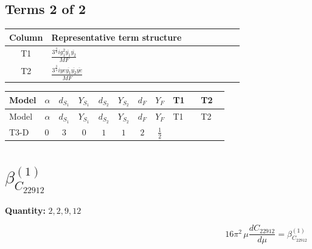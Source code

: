 \documentclass[8pt]{article}
\begin{document}
\begin{landscape}
\subsection*{Terms 2 of 2}
\begin{center}
\begin{tabular}{@{}c >{\raggedright\arraybackslash}p{0.82\linewidth}@{}}
\toprule
Column & Representative term structure \\
\midrule
T1 & \(\displaystyle \frac{3^{\frac{3}{4}} i g_{1}^{2} \overline{y_{1}} \overline{y_{2}}}{MF}\) \\
\midrule
T2 & \(\displaystyle \frac{3^{\frac{3}{4}} i ye \overline{y_{1}} \overline{y_{2}} \overline{ye}}{MF}\) \\
\midrule
\bottomrule
\end{tabular}
\end{center}
\smallskip
\tiny
\begin{longtable}{@{}llcccccc >{\raggedright\arraybackslash}p{0.21\linewidth} >{\raggedright\arraybackslash}p{0.21\linewidth}@{}}
\toprule
Model & $\alpha$ & $d_{S_1}$ & $Y_{S_1}$ & $d_{S_2}$ & $Y_{S_2}$ & $d_F$ & $Y_F$ & T1 & T2 \\
\midrule
\endfirsthead
\toprule
Model & $\alpha$ & $d_{S_1}$ & $Y_{S_1}$ & $d_{S_2}$ & $Y_{S_2}$ & $d_F$ & $Y_F$ & T1 & T2 \\
\midrule
\endhead
T3-D & $0$ & $3$ & $0$ & $1$ & $1$ & $2$ & $\frac{1}{2}$ & \scriptsize\adjustbox{max width=\linewidth}{$\begin{gathered} - \frac{3^{\frac{3}{4}} i g_{1}^{2} \overline{y_{1}} \overline{y_{2}}}{8 MF}\end{gathered}$} & \scriptsize\adjustbox{max width=\linewidth}{$\begin{gathered} \frac{3^{\frac{3}{4}} i ye \overline{y_{1}} \overline{y_{2}} \overline{ye}}{12 MF}\end{gathered}$} \\
\midrule
\bottomrule
\end{longtable}
\clearpage
\section*{$\beta_{C_{22912}}^{(1)}$}
\noindent\textbf{Quantity: }$\mathrm{2,2,9,12}$\par\smallskip
\[16\pi^2\,\mu\frac{d C_{22912}}{d\mu}=\beta_{C_{22912}}^{(1)}\]

\end{landscape}
\end{document}
